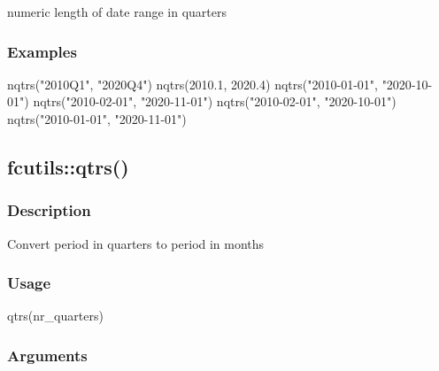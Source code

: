 \documentclass[
  letterpaper,
  DIV=11,
  numbers=noendperiod]{scrreport}
\newenvironment{Shaded}{\begin{snugshade}}{\end{snugshade}}
\newcommand{\FloatTok}[1]{\textcolor[rgb]{0.68,0.00,0.00}{#1}}
\newcommand{\FunctionTok}[1]{\textcolor[rgb]{0.28,0.35,0.67}{#1}}
\newcommand{\NormalTok}[1]{\textcolor[rgb]{0.00,0.23,0.31}{#1}}
\newcommand{\StringTok}[1]{\textcolor[rgb]{0.13,0.47,0.30}{#1}}
\begin{document}
numeric length of date range in quarters

\subsubsection{Examples}\label{examples-17}

\begin{Shaded}
\begin{Highlighting}[]
\FunctionTok{nqtrs}\NormalTok{(}\StringTok{"2010Q1"}\NormalTok{, }\StringTok{"2020Q4"}\NormalTok{)}
\FunctionTok{nqtrs}\NormalTok{(}\FloatTok{2010.1}\NormalTok{, }\FloatTok{2020.4}\NormalTok{)}
\FunctionTok{nqtrs}\NormalTok{(}\StringTok{"2010{-}01{-}01"}\NormalTok{, }\StringTok{"2020{-}10{-}01"}\NormalTok{)}
\FunctionTok{nqtrs}\NormalTok{(}\StringTok{"2010{-}02{-}01"}\NormalTok{, }\StringTok{"2020{-}11{-}01"}\NormalTok{)}
\FunctionTok{nqtrs}\NormalTok{(}\StringTok{"2010{-}02{-}01"}\NormalTok{, }\StringTok{"2020{-}10{-}01"}\NormalTok{)}
\FunctionTok{nqtrs}\NormalTok{(}\StringTok{"2010{-}01{-}01"}\NormalTok{, }\StringTok{"2020{-}11{-}01"}\NormalTok{)}
\end{Highlighting}
\end{Shaded}

\subsection{fcutils::qtrs()}\label{fcutilsqtrs}

\subsubsection{Description}\label{description-18}

Convert period in quarters to period in months

\subsubsection{Usage}\label{usage-18}

\begin{Shaded}
\begin{Highlighting}[]
\FunctionTok{qtrs}\NormalTok{(nr\_quarters)}
\end{Highlighting}
\end{Shaded}

\subsubsection{Arguments}\label{arguments-18}
\end{document}

